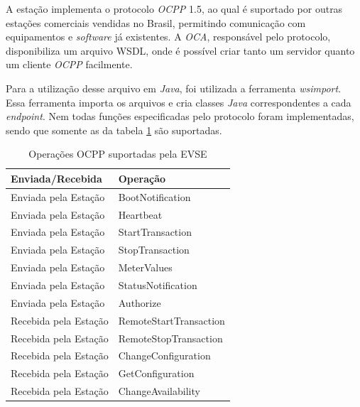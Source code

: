       A estação implementa o protocolo \textit{\ac{OCPP}} 1.5, ao qual é suportado por outras estações comerciais vendidas no Brasil, permitindo comunicação com equipamentos e \textit{software} já existentes. A \textit{\ac{OCA}}, responsável pelo protocolo, disponibiliza um arquivo WSDL, onde é possível criar tanto um servidor quanto um cliente \textit{\ac{OCPP}} facilmente.

      Para a utilização desse arquivo em \textit{Java}, foi utilizada a ferramenta \textit{wsimport}. Essa ferramenta importa os arquivos e cria classes \textit{Java} correspondentes a cada \textit{endpoint}. Nem todas funções especificadas pelo protocolo foram implementadas, sendo que somente as da tabela \ref{table:ocpp} são suportadas.

      \begin{table}[]
        \centering
        \caption{Operações OCPP suportadas pela EVSE}
        \label{table:ocpp}
        \begin{tabular}{@{}ll@{}}
          \toprule
          \textbf{Enviada/Recebida} & \textbf{Operação}      \\ \midrule
            Enviada pela Estação      & BootNotification       \\
            Enviada pela Estação      & Heartbeat              \\
            Enviada pela Estação      & StartTransaction       \\
            Enviada pela Estação      & StopTransaction        \\
            Enviada pela Estação      & MeterValues            \\
            Enviada pela Estação      & StatusNotification     \\
            Enviada pela Estação      & Authorize              \\
            Recebida pela Estação     & RemoteStartTransaction \\
            Recebida pela Estação     & RemoteStopTransaction  \\
            Recebida pela Estação     & ChangeConfiguration    \\
            Recebida pela Estação     & GetConfiguration       \\
            Recebida pela Estação     & ChangeAvailability     \\ \bottomrule
        \end{tabular}
      \end{table}

